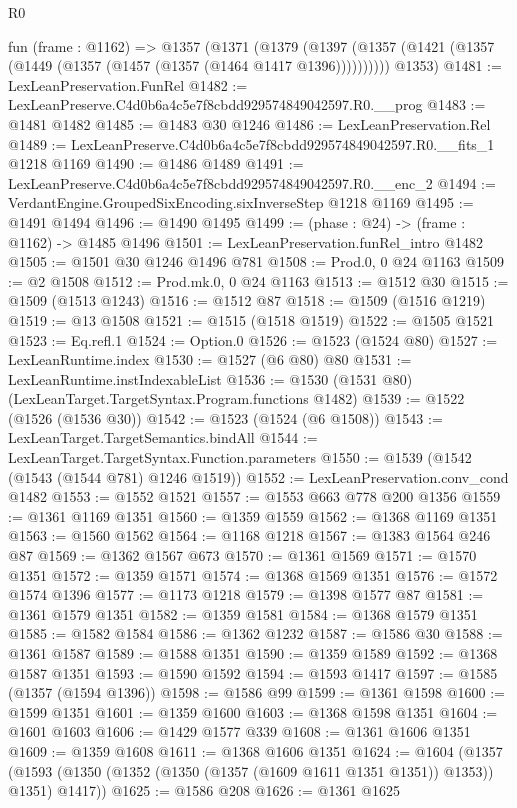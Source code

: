 \begin{lexlean}{R0}
\begin{coremodule}
  fun (frame : @1162) =>
  @1357
    (@1371
      (@1379 (@1397 (@1357 (@1421 (@1357 (@1449 (@1357 (@1457 (@1357 (@1464 @1417 @1396))))))))))
      @1353)
@1481 := LexLeanPreservation.FunRel
@1482 := LexLeanPreserve.C4d0b6a4c5e7f8cbdd929574849042597.R0.__prog
@1483 := @1481 @1482
@1485 := @1483 @30 @1246
@1486 := LexLeanPreservation.Rel
@1489 := LexLeanPreserve.C4d0b6a4c5e7f8cbdd929574849042597.R0.__fits_1 @1218 @1169
@1490 := @1486 @1489
@1491 := LexLeanPreserve.C4d0b6a4c5e7f8cbdd929574849042597.R0.__enc_2
@1494 := VerdantEngine.GroupedSixEncoding.sixInverseStep @1218 @1169
@1495 := @1491 @1494
@1496 := @1490 @1495
@1499 := (phase : @24) -> (frame : @1162) -> @1485 @1496
@1501 := LexLeanPreservation.funRel_intro @1482
@1505 := @1501 @30 @1246 @1496 @781
@1508 := Prod.{0, 0} @24 @1163
@1509 := @2 @1508
@1512 := Prod.mk.{0, 0} @24 @1163
@1513 := @1512 @30
@1515 := @1509 (@1513 @1243)
@1516 := @1512 @87
@1518 := @1509 (@1516 @1219)
@1519 := @13 @1508
@1521 := @1515 (@1518 @1519)
@1522 := @1505 @1521
@1523 := Eq.refl.{1}
@1524 := Option.{0}
@1526 := @1523 (@1524 @80)
@1527 := LexLeanRuntime.index
@1530 := @1527 (@6 @80) @80
@1531 := LexLeanRuntime.instIndexableList
@1536 := @1530 (@1531 @80) (LexLeanTarget.TargetSyntax.Program.functions @1482)
@1539 := @1522 (@1526 (@1536 @30))
@1542 := @1523 (@1524 (@6 @1508))
@1543 := LexLeanTarget.TargetSemantics.bindAll
@1544 := LexLeanTarget.TargetSyntax.Function.parameters
@1550 := @1539 (@1542 (@1543 (@1544 @781) @1246 @1519))
@1552 := LexLeanPreservation.conv_cond @1482
@1553 := @1552 @1521
@1557 := @1553 @663 @778 @200 @1356
@1559 := @1361 @1169 @1351
@1560 := @1359 @1559
@1562 := @1368 @1169 @1351
@1563 := @1560 @1562
@1564 := @1168 @1218
@1567 := @1383 @1564 @246 @87
@1569 := @1362 @1567 @673
@1570 := @1361 @1569
@1571 := @1570 @1351
@1572 := @1359 @1571
@1574 := @1368 @1569 @1351
@1576 := @1572 @1574 @1396
@1577 := @1173 @1218
@1579 := @1398 @1577 @87
@1581 := @1361 @1579 @1351
@1582 := @1359 @1581
@1584 := @1368 @1579 @1351
@1585 := @1582 @1584
@1586 := @1362 @1232
@1587 := @1586 @30
@1588 := @1361 @1587
@1589 := @1588 @1351
@1590 := @1359 @1589
@1592 := @1368 @1587 @1351
@1593 := @1590 @1592
@1594 := @1593 @1417
@1597 := @1585 (@1357 (@1594 @1396))
@1598 := @1586 @99
@1599 := @1361 @1598
@1600 := @1599 @1351
@1601 := @1359 @1600
@1603 := @1368 @1598 @1351
@1604 := @1601 @1603
@1606 := @1429 @1577 @339
@1608 := @1361 @1606 @1351
@1609 := @1359 @1608
@1611 := @1368 @1606 @1351
@1624 := @1604
    (@1357 (@1593 (@1350 (@1352 (@1350 (@1357 (@1609 @1611 @1351 @1351)) @1353)) @1351) @1417))
@1625 := @1586 @208
@1626 := @1361 @1625

\end{coremodule}
\end{lexlean}
